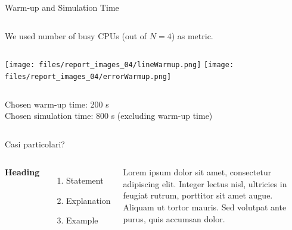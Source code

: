 \documentclass[aspectratio=169,xcolor=dvipsnames]{beamer}
\begin{document}

\begin{frame}{Warm-up and Simulation Time}
    \begin{columns}[c]
        We used number of busy CPUs (out of $N = 4$) as metric.
    \end{columns}
    \begin{columns}[c] %
        \texttt{[image: files/report\_images\_04/lineWarmup.png]}
        \texttt{[image: files/report\_images\_04/errorWarmup.png]}
    \end{columns}
    \begin{columns}[c]
        \begin{block}{}
            Chosen warm-up time: 200 s\\
            Chosen simulation time: 800 s (excluding warm-up time)
        \end{block}
    \end{columns}
\end{frame}


\begin{frame}{Casi particolari?}
    \begin{columns}[c] %

        \textbf{Heading}
        \begin{enumerate}
            \item Statement
            \item Explanation
            \item Example
        \end{enumerate}

        Lorem ipsum dolor sit amet, consectetur adipiscing elit. Integer lectus nisl, ultricies in feugiat rutrum, porttitor sit amet augue. Aliquam ut tortor mauris. Sed volutpat ante purus, quis accumsan dolor.

    \end{columns}
\end{frame}
\end{document}
